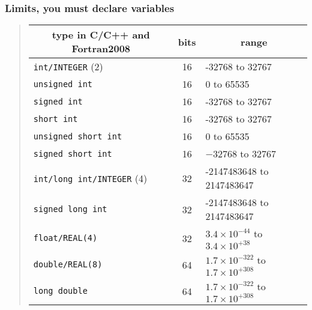 \documentclass[handout]{beamer}
\newenvironment{block_mdfboxadmon}[1][]{\begin{block}{#1}}{\end{block}}
\begin{document}
\begin{frame}
\frametitle{Limits, you must declare variables}

\begin{block_mdfboxadmon}


\begin{quote}
\begin{tabular}{lcl}
\hline
\multicolumn{1}{c}{ type in C/C++ and Fortran2008 } & \multicolumn{1}{c}{ bits } & \multicolumn{1}{c}{ range } \\
\hline
\Verb!int/INTEGER! (2)                         & 16                                             & -32768 to 32767                                \\
\Verb!unsigned int!                            & 16                                             & 0 to 65535                                     \\
\Verb!signed int!                              & 16                                             & -32768 to 32767                                \\
\Verb!short int!                               & 16                                             & -32768 to 32767                                \\
\Verb!unsigned short int!                      & 16                                             & 0 to 65535                                     \\
\Verb!signed short int!                        & 16                                             & $-32768$ to 32767                              \\
\Verb!int/long int/INTEGER! (4)                & 32                                             & -2147483648 to 2147483647                      \\
\Verb!signed long int!                         & 32                                             & -2147483648 to 2147483647                      \\
\Verb!float/REAL(4)!                           & 32                                             & $3.4\times 10^{-44}$ to $3.4\times 10^{+38}$   \\
\Verb!double/REAL(8)!                          & 64                                             & $1.7\times 10^{-322}$ to $1.7\times 10^{+308}$ \\
\Verb!long double!                             & 64                                             & $1.7\times 10^{-322}$ to $1.7\times 10^{+308}$ \\
\hline
\end{tabular}
\end{quote}

\noindent
\end{block_mdfboxadmon}
\end{frame}
\end{document}
